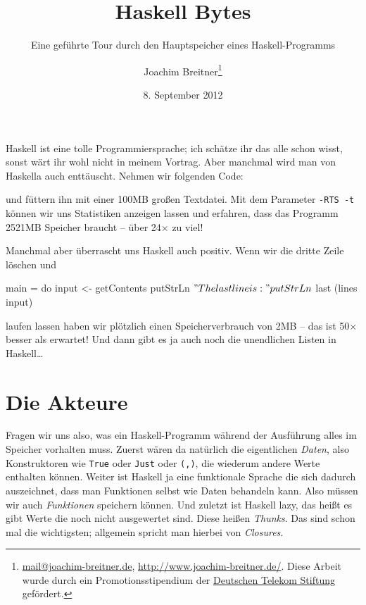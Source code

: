 \documentclass[11pt,DIV=12,parskip=half,headings=normal,abstract]{scrartcl}
\author{Joachim Breitner\footnote{\href{mailto:mail@joachim-breitner.de}{mail@joachim-breitner.de}, \url{http://www.joachim-breitner.de/}. Diese Arbeit wurde durch ein Promotionsstipendium der \href{http://telekom-stiftung.de/}{Deutschen Telekom Stiftung} gefördert.}}
\title{Haskell Bytes}
\subtitle{Eine geführte Tour durch den Hauptspeicher eines Haskell-Programms}
\date{8. September 2012}
\newcommand{\li}{\lstinline[style=haskell]}
\begin{document}
\maketitle

Haskell ist eine tolle Programmiersprache; ich schätze ihr das alle schon wisst, sonst wärt ihr wohl nicht in meinem Vortrag. Aber manchmal wird man von Haskella auch enttäuscht. Nehmen wir folgenden Code:
und füttern ihn mit einer 100MB großen Textdatei. Mit dem Parameter \texttt{-RTS -t} können wir uns Statistiken anzeigen lassen und erfahren, dass das Programm 2521MB Speicher braucht – über 24$\times$ zu viel!

Manchmal aber überrascht uns Haskell auch positiv. Wenn wir die dritte Zeile löschen und
\begin{haskell}
main = do
    input <- getContents
    putStrLn $ "The last line is:"
    putStrLn $ last (lines input)
\end{haskell}
laufen lassen haben wir plötzlich einen Speicherverbrauch von 2MB – das ist 50$\times$ besser als erwartet! Und dann gibt es ja auch noch die unendlichen Listen in Haskell\dots

\section{Die Akteure}

Fragen wir uns also, was ein Haskell-Programm während der Ausführung alles im Speicher vorhalten muss. Zuerst wären da natürlich die eigentlichen \emph{Daten}, also Konstruktoren wie \li-True- oder \li-Just- oder \li-(,)-, die wiederum andere Werte enthalten können. Weiter ist Haskell ja eine funktionale Sprache die sich dadurch auszeichnet, dass man Funktionen selbst wie Daten behandeln kann. Also müssen wir auch \emph{Funktionen} speichern können. Und zuletzt ist Haskell lazy, das heißt es gibt Werte die noch nicht ausgewertet sind. Diese heißen \emph{Thunks}. Das sind schon mal die wichtigsten; allgemein spricht man hierbei von \emph{Closures}.
\end{document}
